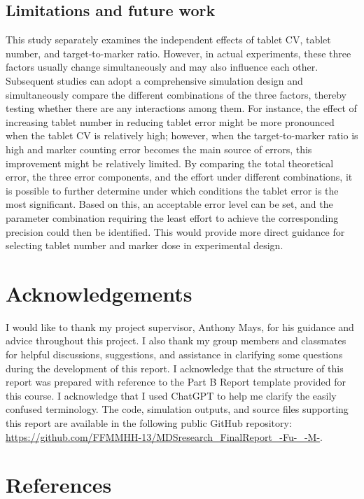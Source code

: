 \documentclass[
  12pt,
]{article}
\begin{document}
\subsection{Limitations and future
work}\label{limitations-and-future-work}

This study separately examines the independent effects of tablet CV,
tablet number, and target-to-marker ratio. However, in actual
experiments, these three factors usually change simultaneously and may
also influence each other. Subsequent studies can adopt a comprehensive
simulation design and simultaneously compare the different combinations
of the three factors, thereby testing whether there are any interactions
among them. For instance, the effect of increasing tablet number in
reducing tablet error might be more pronounced when the tablet CV is
relatively high; however, when the target-to-marker ratio is high and
marker counting error becomes the main source of errors, this
improvement might be relatively limited. By comparing the total
theoretical error, the three error components, and the effort under
different combinations, it is possible to further determine under which
conditions the tablet error is the most significant. Based on this, an
acceptable error level can be set, and the parameter combination
requiring the least effort to achieve the corresponding precision could
then be identified. This would provide more direct guidance for
selecting tablet number and marker dose in experimental design.

\section{Acknowledgements}\label{acknowledgements}

I would like to thank my project supervisor, Anthony Mays, for his
guidance and advice throughout this project. I also thank my group
members and classmates for helpful discussions, suggestions, and
assistance in clarifying some questions during the development of this
report. I acknowledge that the structure of this report was prepared
with reference to the Part B Report template provided for this course. I
acknowledge that I used ChatGPT to help me clarify the easily confused
terminology. The code, simulation outputs, and source files supporting
this report are available in the following public GitHub repository:
\url{https://github.com/FFMMHH-13/MDSresearch_FinalReport_-Fu-_-M-}.

\section{References}\label{references}
\end{document}
